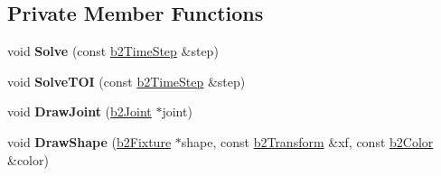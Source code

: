 \subsection*{Private Member Functions}
\begin{DoxyCompactItemize}
\item 
\mbox{\label{classb2World_a6cac2e86197dd42f05ed135e7bea41e0}} 
void {\bfseries Solve} (const \mbox{\hyperlink{structb2TimeStep}{b2\+Time\+Step}} \&step)
\item 
\mbox{\label{classb2World_ae9524ce16eb46732d15df9148e715e0e}} 
void {\bfseries Solve\+T\+OI} (const \mbox{\hyperlink{structb2TimeStep}{b2\+Time\+Step}} \&step)
\item 
\mbox{\label{classb2World_af3d7aaf71b4cbb99760a7cd2f2ba43d7}} 
void {\bfseries Draw\+Joint} (\mbox{\hyperlink{classb2Joint}{b2\+Joint}} $\ast$joint)
\item 
\mbox{\label{classb2World_ac013bf7fbe36cda452a707ea62a46c39}} 
void {\bfseries Draw\+Shape} (\mbox{\hyperlink{classb2Fixture}{b2\+Fixture}} $\ast$shape, const \mbox{\hyperlink{structb2Transform}{b2\+Transform}} \&xf, const \mbox{\hyperlink{structb2Color}{b2\+Color}} \&color)
\end{DoxyCompactItemize}
